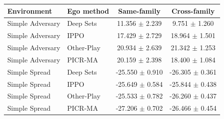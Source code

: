 \begin{tabular}{llcc}
\toprule
Environment & Ego method & Same-family & Cross-family \\
\midrule
Simple Adversary & Deep Sets & 11.356 $\pm$ 2.239 & 9.751 $\pm$ 1.260 \\
Simple Adversary & IPPO & 17.429 $\pm$ 2.729 & 18.964 $\pm$ 1.501 \\
Simple Adversary & Other-Play & 20.934 $\pm$ 2.639 & 21.342 $\pm$ 1.253 \\
Simple Adversary & PICR-MA & 20.159 $\pm$ 2.398 & 18.400 $\pm$ 1.084 \\
Simple Spread & Deep Sets & -25.550 $\pm$ 0.910 & -26.305 $\pm$ 0.361 \\
Simple Spread & IPPO & -25.649 $\pm$ 0.584 & -25.844 $\pm$ 0.438 \\
Simple Spread & Other-Play & -25.533 $\pm$ 0.782 & -26.260 $\pm$ 0.437 \\
Simple Spread & PICR-MA & -27.206 $\pm$ 0.702 & -26.466 $\pm$ 0.454 \\
\bottomrule
\end{tabular}

